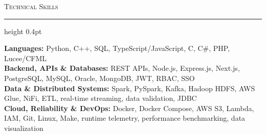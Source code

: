 \documentclass[letterpaper,11pt]{article}
\newcommand{\resumesection}[1]{%
  \par\vspace{2pt}%
  {\large\scshape #1}\par\vspace{2pt}%
  \hrule height 0.4pt\vspace{2pt}%
}
\begin{document}
\resumesection{Technical Skills}
\textbf{Languages:} Python, C++, SQL, TypeScript/JavaScript, C, C\#, PHP, Lucee/CFML\\
\textbf{Backend, APIs \& Databases:} REST APIs, Node.js, Express.js, Next.js, PostgreSQL, MySQL, Oracle, MongoDB, JWT, RBAC, SSO\\
\textbf{Data \& Distributed Systems:} Spark, PySpark, Kafka, Hadoop HDFS, AWS Glue, NiFi, ETL, real-time streaming, data validation, JDBC\\
\textbf{Cloud, Reliability \& DevOps:} Docker, Docker Compose, AWS S3, Lambda, IAM, Git, Linux, Make, runtime telemetry, performance benchmarking, data visualization
\end{document}
